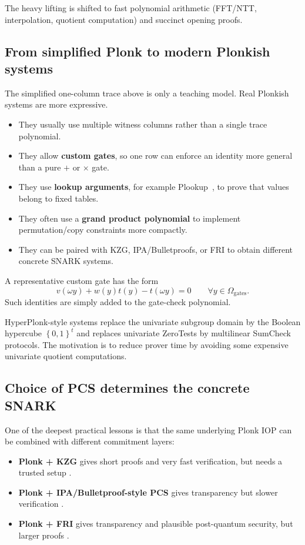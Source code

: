 \documentclass[11pt]{article}
\newcommand{\set}[1]{\left\{#1\right\}}
\begin{document}
The heavy lifting is shifted to fast polynomial arithmetic (FFT/NTT, interpolation, quotient computation) and succinct opening proofs.

\subsection{From simplified Plonk to modern Plonkish systems}

The simplified one-column trace above is only a teaching model. Real Plonkish systems are more expressive.

\begin{itemize}[leftmargin=2em]
    \item They usually use multiple witness columns rather than a single trace polynomial.
    \item They allow \textbf{custom gates}, so one row can enforce an identity more general than a pure $+$ or $\times$ gate.
    \item They use \textbf{lookup arguments}, for example Plookup~\cite{GabizonWilliamson2020Plookup}, to prove that values belong to fixed tables.
    \item They often use a \textbf{grand product polynomial} to implement permutation/copy constraints more compactly.
    \item They can be paired with KZG, IPA/Bulletproofs, or FRI to obtain different concrete SNARK systems.
\end{itemize}

A representative custom gate has the form
\[
    v(\omega y)+w(y)t(y)-t(\omega y)=0
    \qquad\forall y\in\Omega_{\mathrm{gates}}.
\]
Such identities are simply added to the gate-check polynomial.

HyperPlonk-style systems replace the univariate subgroup domain by the Boolean hypercube $\set{0,1}^t$ and replaces univariate ZeroTests by multilinear SumCheck protocols. The motivation is to reduce prover time by avoiding some expensive univariate quotient computations.

\subsection{Choice of PCS determines the concrete SNARK}

One of the deepest practical lessons is that the same underlying Plonk IOP can be combined with different commitment layers:
\begin{itemize}[leftmargin=2em]
    \item \textbf{Plonk + KZG} gives short proofs and very fast verification, but needs a trusted setup \cite{KateZaveruchaGoldberg2010,GabizonWilliamsonCiobotaru2019}.
    \item \textbf{Plonk + IPA/Bulletproof-style PCS} gives transparency but slower verification \cite{Bulletproofs2018}.
    \item \textbf{Plonk + FRI} gives transparency and plausible post-quantum security, but larger proofs \cite{BenSassonBentovHoreshRiabzev2018FRI}.
\end{itemize}
\end{document}
